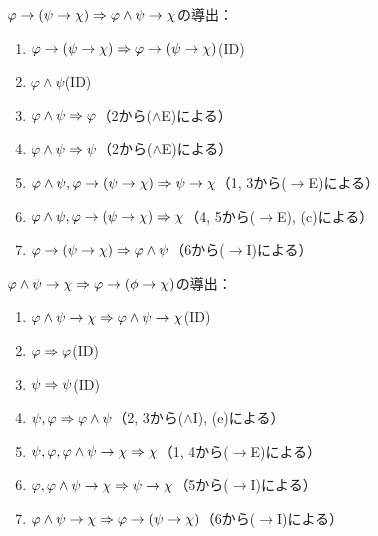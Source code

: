 \(\varphi \to \paren{\psi \to \chi} \sequent \varphi \land \psi \to \chi\)の導出：
\begin{enumerate}
	\item \(\varphi \to \paren{\psi \to \chi} \sequent \varphi \to \paren{\psi \to \chi}\)\quad (ID)
	\item \(\varphi \land \psi\)\quad (ID)
	\item \(\varphi \land \psi \Rightarrow \varphi\)\quad （2から(\(\land\)E)による）
	\item \(\varphi \land \psi \Rightarrow \psi\)\quad （2から(\(\land\)E)による）
	\item \(\varphi \land \psi, \varphi \to \paren{\psi \to \chi} \sequent \psi \to \chi\)\quad （1, 3から(\(\to\)E)による）
	\item \(\varphi \land \psi, \varphi \to \paren{\psi \to \chi} \sequent \chi\)\quad （4, 5から(\(\to\)E), (c)による）
	\item \(\varphi \to \paren{\psi \to \chi} \sequent \varphi \land \psi\)\quad （6から(\(\to\)I)による）
\end{enumerate}

\(\varphi \land \psi \to \chi \sequent \varphi \to \paren{\phi \to \chi}\)の導出：
\begin{enumerate}
	\item \(\varphi \land \psi \to \chi \Rightarrow \varphi \land \psi \to \chi\)\quad (ID)
	\item \(\varphi \Rightarrow \varphi\)\quad (ID)
	\item \(\psi \Rightarrow \psi\)\quad (ID)
	\item \(\psi, \varphi \Rightarrow \varphi \land \psi\)\quad （2, 3から(\(\land\)I), (e)による）
	\item \(\psi, \varphi, \varphi \land \psi \to \chi \Rightarrow \chi\)\quad （1, 4から(\(\to\)E)による）
	\item \(\varphi, \varphi \land \psi \to \chi \Rightarrow \psi \to \chi\)\quad （5から(\(\to\)I)による）
	\item \(\varphi \land \psi \to \chi \sequent \varphi \to \paren{\psi \to \chi}\)\quad （6から(\(\to\)I)による）
\end{enumerate}

